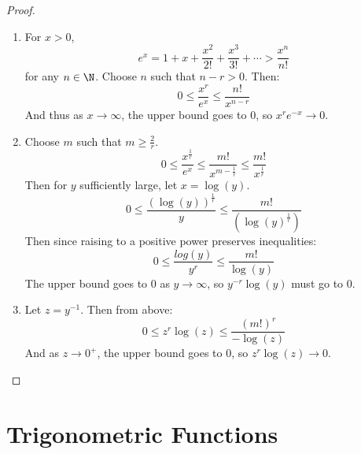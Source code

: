 \documentclass[../Main.tex]{subfiles}
\begin{document}
\begin{proof}
    \begin{enumerate}
        \item For $x > 0$,
            \begin{equation*}
                e^x = 1 + x + \frac{x^2}{2!} + \frac{x^3}{3!} + \cdots > \frac{x^n}{n!}
            \end{equation*}
            for any $n \in \N$. Choose $n$ such that $n - r > 0$. Then:
            \begin{equation*}
                0 \leq \frac{x^r}{e^x} \leq \frac{n!}{x^{n-r}}
            \end{equation*}
            And thus as $x \to \infty$, the upper bound goes to $0$, so $x^r e^{-x} \to 0$.
        \item Choose $m$ such that $m \geq \frac{2}{r}$.
            \begin{equation*}
                0 \leq \frac{x^{\frac{1}{r}}}{e^x} \leq \frac{m!}{x^{m - \frac{1}{r}}} \leq \frac{m!}{x^{\frac{1}{r}}}
            \end{equation*}
            Then for $y$ sufficiently large, let $x = \log(y)$.
            \begin{equation*}
                0 \leq \frac{(\log(y))^\frac{1}{r}}{y} \leq \frac{m!}{(\log(y)^\frac{1}{r})}
            \end{equation*}
            Then since raising to a positive power preserves inequalities:
            \begin{equation*}
                0 \leq \frac{log(y)}{y^r} \leq \frac{m!}{\log(y)}
            \end{equation*}
            The upper bound goes to $0$ as $y \to \infty$, so $y^{-r} \log(y)$ must go to $0$.
        \item Let $z = y^{-1}$. Then from above:
            \begin{equation*}
                0 \leq z^r \log(z) \leq \frac{(m!)^r}{-\log(z)}
            \end{equation*}
            And as $z \to 0^+$, the upper bound goes to $0$, so $z^r \log(z) \to 0$.
    \end{enumerate}
\end{proof}
\section{Trigonometric Functions}
\end{document}
